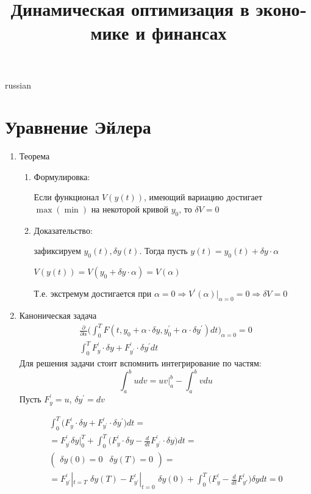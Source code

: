 \documentclass{article}
\begin{document}
\title{\foreignlanguage{russian}{Динамическая оптимизация в экономике и финансах}}
\maketitle

\begin{otherlanguage*}{russian}
\section{\foreignlanguage{russian}{Уравнение Эйлера}}
\begin{enumerate}
\item Теорема

\begin{enumerate}

\item Формулировка: 

Если функционал $ V(y(t)) $, имеющий вариацию достигает $ \max (\min)$ на некоторой кривой $y_0$, то $ \delta V = 0 $ 

\item Доказательство: 

зафиксируем $y_0(t), \delta y(t)$. Тогда пусть $ y(t) = y_0(t) + \delta y \cdot \alpha $ 

$ V(y(t)) = V(y_0 + \delta y \cdot \alpha) = V(\alpha) $ 

Т.е. экстремум достигается при $\alpha = 0 \Rightarrow V^{'} (\alpha)|_{\alpha = 0} = 0 \Rightarrow \delta V = 0 $ 
\end{enumerate}

\item Каноническая задача  
\begin{align} 
\frac{\partial }{\partial \alpha} \Big( \int_{0}^T F(t, y_0 + \alpha \cdot \delta y, y^{'}_0 + \alpha \cdot \delta y^{'})dt\Big)_{\alpha = 0} = 0 \\
\int_0^T F^{'}_y \cdot \delta y + F^{'}_{y^{'}} \cdot \delta y^{'} dt 
\end{align} 
Для решения задачи стоит вспомнить интегрирование по частям: 
\begin{equation}
\int_a^b u dv = uv|^b_a - \int_a^b v du 
\end{equation}
Пусть $ F^{'}_y  = u$, $\delta y^{'} = dv $ 

\begin{align}
\int_0^T \Big( F^{'}_y \cdot \delta y + F^{'}_{y^{'}} \cdot \delta y^{'} \Big) dt = \\
= F^{'}_{y^{'}} \delta y|^T_0 + \int_0^T \Big(F^{'}_y \cdot \delta y - \frac{d}{d t} F^{'}_{y^{'}} \cdot \delta y \Big) dt = \\
\begin{pmatrix} \delta y(0) = 0 & \delta y (T) = 0 \end{pmatrix} = \\
= F^{'}_{y^{'}} |_{t = T} \,\,\delta y(T) - F^{'}_{y^{'}} |_{t = 0} \,\,\delta y(0) + \int_0^T \Big( F^{'}_y - \frac{d}{d t} F^{'}_{y{'}} \Big) \delta y dt = 0 
\end{align}


\end{enumerate}
\end{otherlanguage*}
\end{document}
